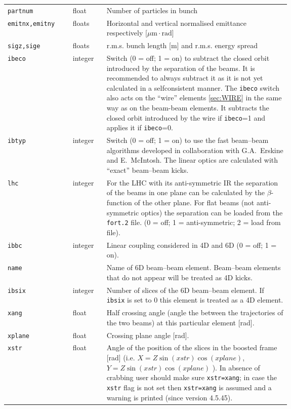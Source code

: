 \bigskip
\begin{longtabu}{@{}llp{0.65\linewidth}}
    \texttt{partnum}       & float   & Number of particles in bunch \\
    \texttt{emitnx,emitny} & floats  & Horizontal and vertical normalised emittance respectively [$\mu \mbox{m}\cdot\mbox{rad}$] \\
    \texttt{sigz,sige}     & floats  & r.m.s. bunch length [m] and r.m.s. energy spread \\
    \texttt{ibeco}         & integer & Switch (0 = off; 1 = on) to subtract the closed orbit introduced by the separation of the beams. It is recommended to always subtract it as it is not yet calculated in a selfconsistent manner. The \texttt{ibeco} switch also acts on the ``wire'' elements \ref{sec:WIRE} in the same way as on the beam-beam elements. It subtracts the closed orbit introduced by the wire if \texttt{ibeco}=1 and applies it if \texttt{ibeco}=0. \\
    \texttt{ibtyp}         & integer & Switch (0 = off; 1 = on) to use the fast beam--beam algorithms developed in collaboration with G.A.~Erskine and E.~McIntosh.  The linear optics are calculated with ``exact'' beam--beam kicks. \\
    \texttt{lhc}           & integer & For the LHC with its anti-symmetric IR the separation of the beams in one plane can be calculated by the $\beta$-function of the other plane. For flat beams (not anti-symmetric optics) the separation can be loaded from the \texttt{fort.2} file. (0 = off; 1 = anti-symmetric; 2 = load from file). \\
    \texttt{ibbc}          & integer & Linear coupling considered in 4D and 6D (0 = off; 1 = on). \\
    \texttt{name}          &           & Name of 6D beam--beam element. Beam--beam elements that do not appear will be treated as 4D kicks. \\
    \texttt{ibsix}         & integer & Number of slices of the 6D beam--beam element. If \texttt{ibsix} is set to 0 this element is treated as a 4D element. \\
    \texttt{xang}          & float   & Half crossing angle (angle the between the trajectories of the two beams) at this particular element [rad]. \\
    \texttt{xplane}        & float   & Crossing plane angle [rad]. \\
    \texttt{xstr}          & float   & Angle of the position of the slices in the boosted frame [rad] (i.e. $X = Z \sin(\mathit{xstr}) \cos(\mathit{xplane})$, $Y =Z \sin(\mathit{xstr}) \cos(\mathit{xplane})$ ).  In absence of crabbing user should make sure \texttt{xstr=xang}; in case the \texttt{xstr} flag is not set then \texttt{xstr=xang} is assumed and a warning is printed (since version 4.5.45).
\end{longtabu}

